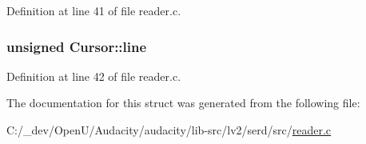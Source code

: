 Definition at line 41 of file reader.\+c.

\subsubsection[{\texorpdfstring{line}{line}}]{\setlength{\rightskip}{0pt plus 5cm}unsigned Cursor\+::line}\hypertarget{struct_cursor_a5a8e665bc240497b8493cd37ca2bb797}{}\label{struct_cursor_a5a8e665bc240497b8493cd37ca2bb797}


Definition at line 42 of file reader.\+c.



The documentation for this struct was generated from the following file\+:\begin{DoxyCompactItemize}
\item 
C\+:/\+\_\+dev/\+Open\+U/\+Audacity/audacity/lib-\/src/lv2/serd/src/\hyperlink{reader_8c}{reader.\+c}\end{DoxyCompactItemize}
